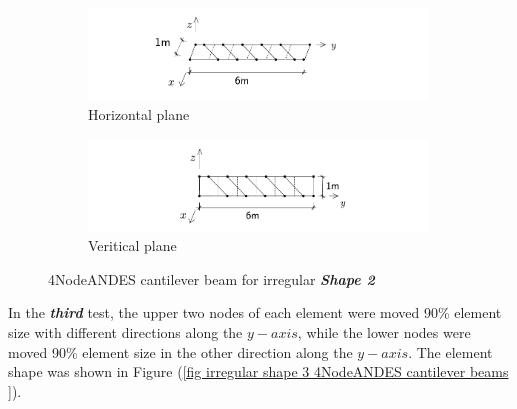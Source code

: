 \documentclass[fleqn,11pt]{article}
\begin{document}
\begin{figure}[H]
  \centering
    \begin{subfigure}{0.5\textwidth}
      \centering
      \includegraphics[width=9cm]{../Figure-files/beam_ANDES_xy_bending_pureshape2.pdf}
      \caption{Horizontal plane}
    \end{subfigure}
    \begin{subfigure}{0.5\textwidth}
      \centering
      \includegraphics[width=9cm]{../Figure-files/beam_ANDES_yz_inPlane_pureshape2.pdf}
      \caption{Veritical  plane}
    \end{subfigure}
  \caption{4NodeANDES cantilever beam for irregular \textbf{\emph{Shape 2}} }
  \label{fig irregular shape 2 4NodeANDES cantilever beams }
\end{figure}





In the \emph{\textbf{third}} test, the upper two nodes of each element were moved 90\% element size with different directions along the $y-axis$, while the lower nodes  were moved 90\% element size in the other direction along the $y-axis$. The element shape was shown in Figure (\ref{fig irregular shape 3 4NodeANDES cantilever beams }).
\end{document}
